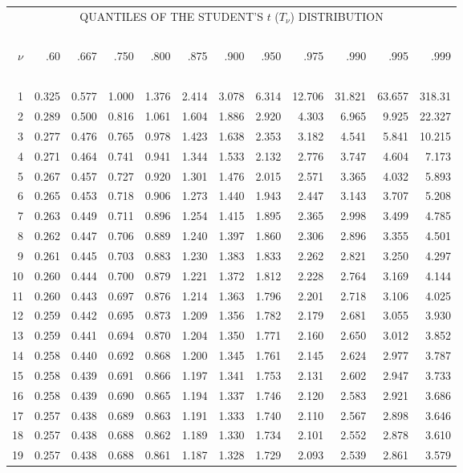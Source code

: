 \documentclass[12pt,a4paper,openany,twoside]{report}
\theoremstyle{definition}
\theoremstyle{remark}
\theoremstyle{plain}
\theoremstyle{definition}
\theoremstyle{definition}
\theoremstyle{definition}
\theoremstyle{remark}
\begin{document}
\begin{center}
\begin{tabular}
      {r@{\quad}r@{\,}r@{\,}r@{\,}r@{\,}r@{\,}r@{\,}r@{\,}r@{\,}r@{\,}r@{\,}r}
\multicolumn{12}{c}{QUANTILES OF THE STUDENT'S $t$ ($T_{\nu}$) DISTRIBUTION} \\
\ \\
$\nu$&.60&.667&.750&.800&.875&.900&.950&.975&.990&.995&.999 \\
\ \\
 1&0.325&0.577&1.000&1.376&2.414&3.078&6.314&12.706&31.821&63.657&318.31 \\
 2&0.289&0.500&0.816&1.061&1.604&1.886&2.920&4.303&6.965&9.925&22.327 \\
 3&0.277&0.476&0.765&0.978&1.423&1.638&2.353&3.182&4.541&5.841&10.215 \\
 4&0.271&0.464&0.741&0.941&1.344&1.533&2.132&2.776&3.747&4.604&7.173 \\
 5&0.267&0.457&0.727&0.920&1.301&1.476&2.015&2.571&3.365&4.032&5.893 \\
 6&0.265&0.453&0.718&0.906&1.273&1.440&1.943&2.447&3.143&3.707&5.208 \\
 7&0.263&0.449&0.711&0.896&1.254&1.415&1.895&2.365&2.998&3.499&4.785 \\
 8&0.262&0.447&0.706&0.889&1.240&1.397&1.860&2.306&2.896&3.355&4.501 \\
 9&0.261&0.445&0.703&0.883&1.230&1.383&1.833&2.262&2.821&3.250&4.297 \\
10&0.260&0.444&0.700&0.879&1.221&1.372&1.812&2.228&2.764&3.169&4.144 \\
11&0.260&0.443&0.697&0.876&1.214&1.363&1.796&2.201&2.718&3.106&4.025 \\
12&0.259&0.442&0.695&0.873&1.209&1.356&1.782&2.179&2.681&3.055&3.930 \\
13&0.259&0.441&0.694&0.870&1.204&1.350&1.771&2.160&2.650&3.012&3.852 \\
14&0.258&0.440&0.692&0.868&1.200&1.345&1.761&2.145&2.624&2.977&3.787 \\
15&0.258&0.439&0.691&0.866&1.197&1.341&1.753&2.131&2.602&2.947&3.733 \\
16&0.258&0.439&0.690&0.865&1.194&1.337&1.746&2.120&2.583&2.921&3.686 \\
17&0.257&0.438&0.689&0.863&1.191&1.333&1.740&2.110&2.567&2.898&3.646 \\
18&0.257&0.438&0.688&0.862&1.189&1.330&1.734&2.101&2.552&2.878&3.610 \\
19&0.257&0.438&0.688&0.861&1.187&1.328&1.729&2.093&2.539&2.861&3.579 \\

\end{tabular}
\end{center}
\end{document}

